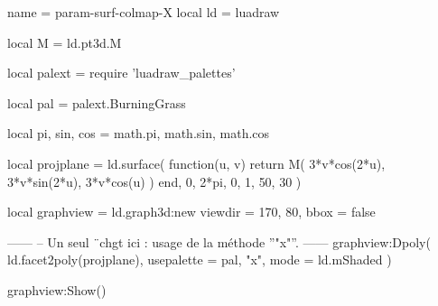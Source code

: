 \documentclass[border = 3pt]{standalone}
\begin{document}
\begin{luadraw*}{name = param-surf-colmap-X}
local ld = luadraw

local M = ld.pt3d.M

local palext = require 'luadraw_palettes'

local pal = palext.BurningGrass

local pi, sin, cos = math.pi, math.sin, math.cos

local projplane = ld.surface(
  function(u, v)
    return M(
      3*v*cos(2*u),
      3*v*sin(2*u),
      3*v*cos(u)
    )
  end,
  0, 2*pi, 0, 1,
  {50, 30}
)

local graphview = ld.graph3d:new{
  viewdir = {170, 80},
  bbox    = false
}

------
-- Un seul ¨chgt ici : usage de la méthode ''"x"''.
------
graphview:Dpoly(
  ld.facet2poly(projplane), 
  {
    usepalette = {pal, "x"},
    mode       = ld.mShaded
  }
)

graphview:Show()
\end{luadraw*}
\end{document}
